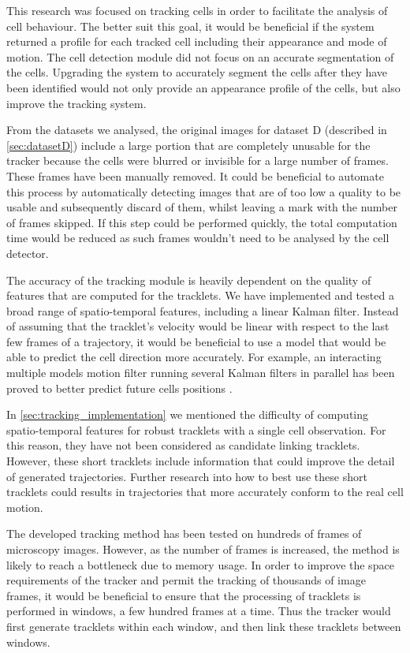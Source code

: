 This research was focused on tracking cells in order to facilitate the analysis of cell behaviour. The better suit this goal, it would be beneficial if the system returned a profile for each tracked cell including their appearance and mode of motion. The cell detection module did not focus on an accurate segmentation of the cells. Upgrading the system to accurately segment the cells after they have been identified would not only provide an appearance profile of the cells, but also improve the tracking system. 

From the datasets we analysed, the original images for dataset D (described in \cref{sec:datasetD}) include a large portion that are completely unusable for the tracker because the cells were blurred or invisible for a large number of frames. These frames have been manually removed. It could be beneficial to automate this process by automatically detecting images that are of too low a quality to be usable and subsequently discard of them, whilst leaving a mark with the number of frames skipped. If this step could be performed quickly, the total computation time would be reduced as such frames wouldn't need to be analysed by the cell detector.

The accuracy of the tracking module is heavily dependent on the quality of features that are computed for the tracklets. We have implemented and tested a broad range of spatio-temporal features, including a linear Kalman filter. Instead of assuming that the tracklet's velocity would be linear with respect to the last few frames of a trajectory, it would be beneficial to use a model that would be able to predict the cell direction more accurately. For example, an interacting multiple models motion filter running several Kalman filters in parallel has been proved to better predict future cells positions \cite{li08}.

In \cref{sec:tracking_implementation} we mentioned the difficulty of computing spatio-temporal features for robust tracklets with a single cell observation. For this reason, they have not been considered as candidate linking tracklets. However, these short tracklets include information that could improve the detail of generated trajectories. Further research into how to best use these short tracklets could results in trajectories that more accurately conform to the real cell motion.

The developed tracking method has been tested on hundreds of frames of microscopy images. However, as the number of frames is increased, the method is likely to reach a bottleneck due to memory usage. In order to improve the space requirements of the tracker and permit the tracking of thousands of image frames, it would be beneficial to ensure that the processing of tracklets is performed in windows, a few hundred frames at a time. Thus the tracker would first generate tracklets within each window, and then link these tracklets between windows. 

